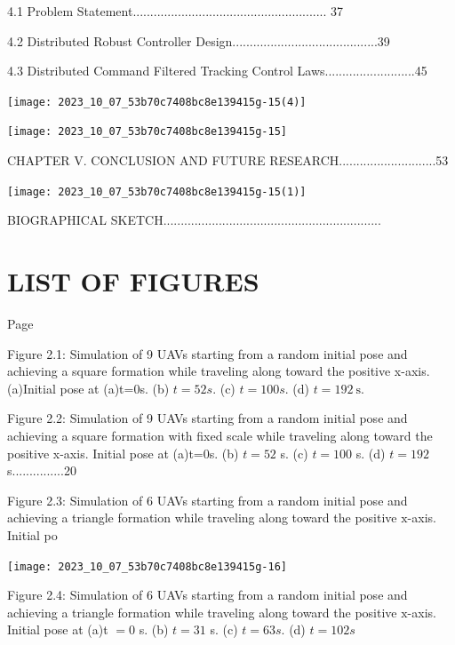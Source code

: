 \documentclass[10pt]{article}
\begin{document}
4.1 Problem Statement........................................................ 37

4.2 Distributed Robust Controller Design..........................................39

4.3 Distributed Command Filtered Tracking Control Laws..........................45

\begin{center}
\texttt{[image: 2023\_10\_07\_53b70c7408bc8e139415g-15(4)]}
\end{center}

\begin{center}
\texttt{[image: 2023\_10\_07\_53b70c7408bc8e139415g-15]}
\end{center}

CHAPTER V. CONCLUSION AND FUTURE RESEARCH............................53

\begin{center}
\texttt{[image: 2023\_10\_07\_53b70c7408bc8e139415g-15(1)]}
\end{center}

BIOGRAPHICAL SKETCH...............................................................

\section{LIST OF FIGURES}
Page

Figure 2.1: Simulation of 9 UAVs starting from a random initial pose and achieving a square formation while traveling along toward the positive x-axis. (a)Initial pose at (a)t=0s. (b) $t=52 s$. (c) $t=100 s$. (d) $t=192 \mathrm{~s}$.

Figure 2.2: Simulation of 9 UAVs starting from a random initial pose and achieving a square formation with fixed scale while traveling along toward the positive x-axis. Initial pose at (a)t=0s. (b) $t=52$ s. (c) $t=100$ s. (d) $t=192$ s...............20

Figure 2.3: Simulation of 6 UAVs starting from a random initial pose and achieving a triangle formation while traveling along toward the positive $\mathrm{x}$-axis. Initial po

\begin{center}
\texttt{[image: 2023\_10\_07\_53b70c7408bc8e139415g-16]}
\end{center}

Figure 2.4: Simulation of 6 UAVs starting from a random initial pose and achieving a triangle formation while traveling along toward the positive $\mathrm{x}$-axis. Initial pose at (a)t $=0$ s. (b) $t=31$ s. (c) $t=63 s$. (d) $t=102 s$
\end{document}
